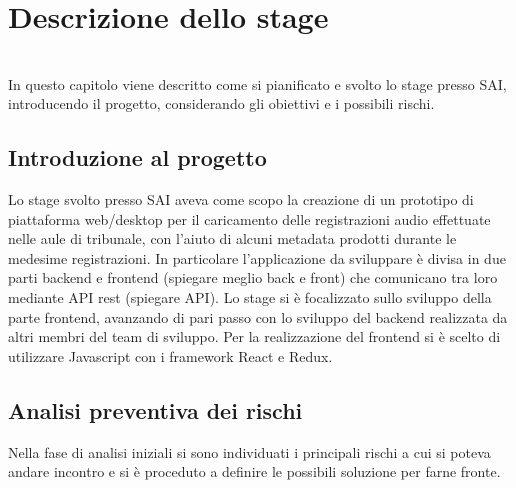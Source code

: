 
\chapter{Descrizione dello stage}
\label{cap:descrizione-stage}

\\

In questo capitolo viene descritto come si pianificato e svolto lo stage presso SAI, introducendo il progetto, considerando gli obiettivi e i possibili rischi.

\section{Introduzione al progetto}

Lo stage svolto presso SAI aveva come scopo la creazione di un prototipo di piattaforma web/desktop per il caricamento delle registrazioni audio effettuate nelle aule di tribunale, con l'aiuto di alcuni metadata prodotti durante le medesime registrazioni. In particolare l'applicazione da sviluppare è divisa in due parti backend e frontend (spiegare meglio back e front) che comunicano tra loro mediante API rest (spiegare API). Lo stage si è focalizzato sullo sviluppo della parte frontend, avanzando di pari passo con lo sviluppo del  backend realizzata da altri membri del team di sviluppo. Per la realizzazione del frontend si è scelto di utilizzare Javascript con i framework React e Redux. 

\section{Analisi preventiva dei rischi}

Nella fase di analisi iniziali si sono individuati i principali rischi a cui si poteva andare incontro e si è proceduto a definire le possibili soluzione per farne fronte.\\

